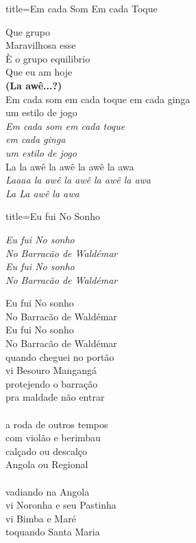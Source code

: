 \documentclass[fontsize=14pt, paper=a4, twoside, DIV=20]{scrreprt} %
\begin{document}
\begin{multicols*}{2}
\begin{song}{title={Em cada Som Em cada Toque}}
\begin{verse*}
            Que grupo\\
            Maravilhosa esse\\
            È o grupo equilibrio\\
            Que eu am hoje\\ 
            \textbf{(La awê...?)}\\
            Em cada som em cada toque em cada ginga\\
            um estilo de jogo\\
            \textit{Em cada som em cada toque\\
            em cada ginga}\\
            \textit{um estilo de jogo}\\
            La la awê la awê la awê la awa\\
            \textit{Laaaa la awê la awê la awê la awa}\\
            \textit{La La awê la awa}\\
        \end{verse*}
\end{song}

\begin{song}{title={Eu fui No Sonho}}
    \begin{chorus*}
            \textit{Eu fui No sonho\\
            No Barracão de Waldémar\\
            Eu fui No sonho\\
            No Barracão de Waldémar\\}
    \end{chorus*}
    \begin{verse*}

            Eu fui No sonho\\
            No Barracão de Waldémar\\
            Eu fui No sonho\\
            No Barracão de Waldémar\\

            quando cheguei no portão\\
            vi Besouro Mangangá\\
            protejendo o barração\\
            pra maldade não entrar\\
\\
            a roda de outros tempos\\
            com violão e berimbau\\
            calçado ou descalço\\
            Angola ou Regional\\
\\
            vadiando na Angola\\
            vi Noronha e seu Pastinha\\
            vi Bimba e Maré\\
            toquando Santa Maria\\


\end{verse*}
\end{song}
\end{multicols*}
\end{document}
